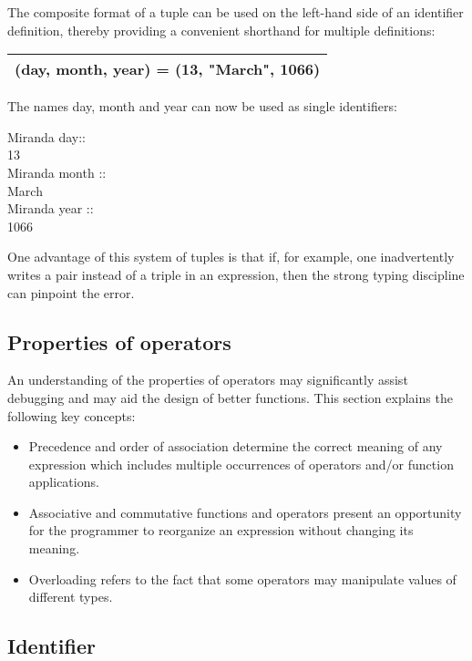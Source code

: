 \documentclass[11pt]{article}
\begin{document}
The composite format of a tuple can be used on the left-hand side of an identifier
definition, thereby providing a convenient shorthand for multiple definitions:
\begin{center}
\begin{tabular}{ |c| } 
 \hline
(day, month, year) = (13, "March", 1066) \\ 
\hline
\end{tabular}
\label{Tab:1}
\end{center}

The names day, month and year can now be used as single identifiers:

\begin{tcolorbox}
Miranda day::\\
13\\


Miranda month ::\\
March\\


Miranda year ::\\
1066
\end{tcolorbox}
One advantage of this system of tuples is that if, for example, one inadvertently writes a pair instead of a triple in an expression, then the strong typing discipline can pinpoint the
error. 

\subsection{Properties of operators}
An understanding of the properties of operators may significantly assist debugging
and may aid the design of better functions. This
section explains the following key concepts:

\begin{itemize}
\item Precedence and order of association determine the correct meaning of any
expression which includes multiple occurrences of operators and/or function
applications.
\item Associative and commutative functions and operators present an opportunity for the programmer to reorganize an expression without changing its
meaning.
\item Overloading refers to the fact that some operators may manipulate values of
different types.
\end{itemize}




\subsection{Identifier}
\end{document}
